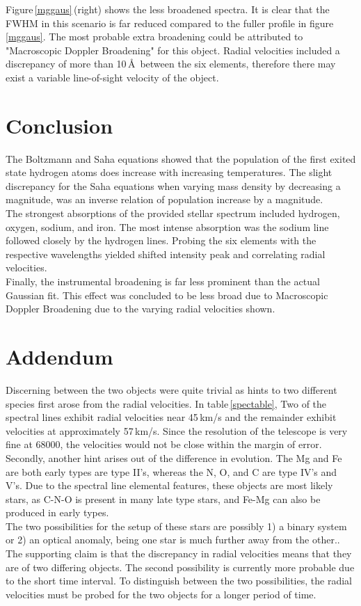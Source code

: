 \documentclass[onecolumn]{aastex6}
\begin{document}
Figure\,\ref{mggaus}\,(right) shows the less broadened spectra. It is clear that the FWHM in this scenario is far reduced compared to the fuller profile in figure\,\ref{mggaus}. The most probable extra broadening could be attributed to "Macroscopic Doppler Broadening" for this object. Radial velocities included a discrepancy of more than 10\,\AA\, between the six elements, therefore there may exist a variable line-of-sight velocity of the object.

\section{Conclusion}
The Boltzmann and Saha equations showed that the population of the first exited state hydrogen atoms does increase with increasing temperatures. The slight discrepancy for the Saha equations when varying mass density by decreasing a magnitude, was an inverse relation of population increase by a magnitude.
\\
\indent The strongest absorptions of the provided stellar spectrum included hydrogen, oxygen, sodium, and iron. The most intense absorption was the sodium line followed closely by the hydrogen lines. Probing the six elements with the respective wavelengths yielded shifted intensity peak and correlating radial velocities.
\\
\indent Finally, the instrumental broadening is far less prominent than the actual Gaussian fit. This effect was concluded to be less broad due to Macroscopic Doppler Broadening due to the varying radial velocities shown.

\section{Addendum}
Discerning between the two objects were quite trivial as hints to two different species first arose from the radial velocities. In table\,\ref{spectable}, Two of the spectral lines exhibit radial velocities near 45\,km/s and the remainder exhibit velocities at approximately 57\,km/s. Since the resolution of the telescope is very fine at 68000, the velocities would not be close within the margin of error. Secondly, another hint arises out of the difference in evolution. The Mg and Fe are both early types are type II's, whereas the N, O, and C are type IV's and V's. Due to the spectral line elemental features, these objects are most likely stars, as C-N-O is present in many late type stars, and Fe-Mg can also be produced in early types.
\\
\indent The two possibilities for the setup of these stars are possibly 1) a binary system or 2) an optical anomaly, being one star is much further away from the other.. The supporting claim is that the discrepancy in radial velocities means that they are of two differing objects. The second possibility is currently more probable due to the short time interval. To distinguish between the two possibilities, the radial velocities must be probed for the two objects for a longer period of time.
\end{document}

